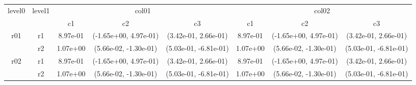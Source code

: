 \begin{tabular}{cccccccc}
\toprule
\multirow{2}{*}{level0} & \multirow{2}{*}{level1}&\multicolumn{3}{c}{col01}&\multicolumn{3}{c}{col02}\tabularnewline
\cmidrule(lr){3-5}
\cmidrule(lr){6-8}
&&c1&c2&c3&c1&c2&c3\tabularnewline
\midrule
\midrule
\multirow{2}{*}{r01}&r1&8.97e-01& (-1.65e+00, 4.97e-01)& (3.42e-01, 2.66e-01)&8.97e-01& (-1.65e+00, 4.97e-01)& (3.42e-01, 2.66e-01)\tabularnewline
&r2&1.07e+00& (5.66e-02, -1.30e-01)& (5.03e-01, -6.81e-01)&1.07e+00& (5.66e-02, -1.30e-01)& (5.03e-01, -6.81e-01)\tabularnewline
\midrule
\multirow{2}{*}{r02}&r1&8.97e-01& (-1.65e+00, 4.97e-01)& (3.42e-01, 2.66e-01)&8.97e-01& (-1.65e+00, 4.97e-01)& (3.42e-01, 2.66e-01)\tabularnewline
&r2&1.07e+00& (5.66e-02, -1.30e-01)& (5.03e-01, -6.81e-01)&1.07e+00& (5.66e-02, -1.30e-01)& (5.03e-01, -6.81e-01)\tabularnewline
\bottomrule
\end{tabular}
